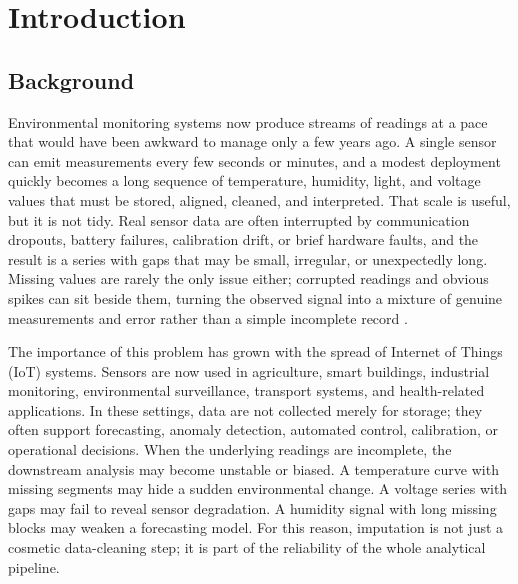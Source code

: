
\chapter{Introduction}
\label{ch:introduction}

\section{Background}
Environmental monitoring systems now produce streams of readings at a pace that would have been awkward to manage only a few years ago. A single sensor can emit measurements every few seconds or minutes, and a modest deployment quickly becomes a long sequence of temperature, humidity, light, and voltage values that must be stored, aligned, cleaned, and interpreted. That scale is useful, but it is not tidy. Real sensor data are often interrupted by communication dropouts, battery failures, calibration drift, or brief hardware faults, and the result is a series with gaps that may be small, irregular, or unexpectedly long. Missing values are rarely the only issue either; corrupted readings and obvious spikes can sit beside them, turning the observed signal into a mixture of genuine measurements and error rather than a simple incomplete record \cite{Adhikari2022ACS,Agbo2022MissingDI,Osman2018ASO}.

The importance of this problem has grown with the spread of Internet of Things (IoT) systems. Sensors are now used in agriculture, smart buildings, industrial monitoring, environmental surveillance, transport systems, and health-related applications. In these settings, data are not collected merely for storage; they often support forecasting, anomaly detection, automated control, calibration, or operational decisions. When the underlying readings are incomplete, the downstream analysis may become unstable or biased. A temperature curve with missing segments may hide a sudden environmental change. A voltage series with gaps may fail to reveal sensor degradation. A humidity signal with long missing blocks may weaken a forecasting model. For this reason, imputation is not just a cosmetic data-cleaning step; it is part of the reliability of the whole analytical pipeline.

